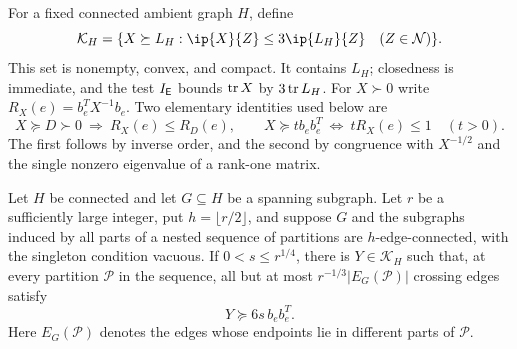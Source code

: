 For a fixed connected ambient graph $H$, define
\begin{equation}\label{tg:compact-domain}
 \mathcal K_H=\{X\succeq L_H:
       \ip{X}{Z}\le3\ip{L_H}{Z}\quad(Z\in\mathcal N)\}.
\end{equation}
This set is nonempty, convex, and compact.  It contains $L_H$;
closedness is immediate, and the test $I_{\mathsf E}$ bounds
$\operatorname{tr} X$ by $3\operatorname{tr} L_H$.  For $X\succ0$ write
$R_X(e)=b_e^TX^{-1}b_e$.  Two elementary identities used below are
\begin{equation}\label{tg:resistance-order}
 X\succeq D\succ0\ \Longrightarrow\ R_X(e)\le R_D(e),
 \qquad
 X\succeq t b_eb_e^T\ \Longleftrightarrow\ tR_X(e)\le1
 \quad(t>0).
\end{equation}
The first follows by inverse order, and the second by congruence
with $X^{-1/2}$ and the single nonzero eigenvalue of a rank-one matrix.

\begin{proposition}\label{prop:tg-response}
Let $H$ be connected and let $G\subseteq H$ be a spanning subgraph.
Let $r$ be a sufficiently large integer, put $h=\lfloor r/2\rfloor$,
and suppose $G$ and the subgraphs induced by all parts of a nested
sequence of partitions are $h$-edge-connected, with the singleton
condition vacuous.  If $0<s\le r^{1/4}$, there is $Y\in\mathcal K_H$
such that, at every partition $\mathcal P$ in the sequence, all but
at most $r^{-1/3}|E_G(\mathcal P)|$ crossing edges satisfy
\begin{equation}\label{tg:response-edge}
 Y\succeq6s\,b_eb_e^T.
\end{equation}
Here $E_G(\mathcal P)$ denotes the edges whose endpoints lie in
different parts of $\mathcal P$.
\end{proposition}

